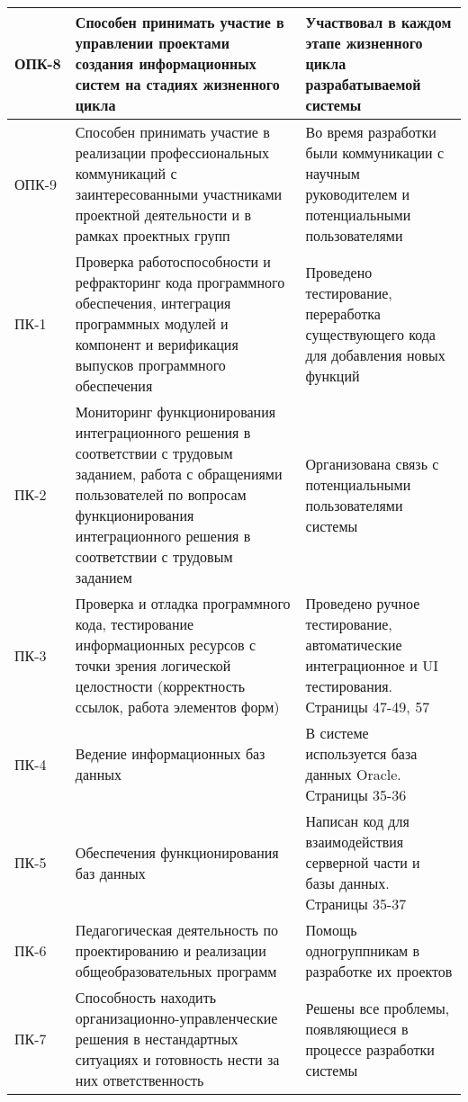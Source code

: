 \documentclass[a4paper,article]{article}
\begin{document}
\begin{sloppypar}
\begin{xltabular}{\textwidth} { |
                >{\hsize} X |
                >{\hsize} X |
                >{\hsize} X | }
            \hline
            ОПК-8
            & Способен принимать участие в управлении проектами создания информационных систем на стадиях жизненного цикла 
            & Участвовал в каждом этапе жизненного цикла разрабатываемой системы \\
            \hline
            ОПК-9
            & Способен принимать участие в реализации профессиональных коммуникаций с заинтересованными участниками проектной деятельности и в рамках проектных групп
            & Во время разработки были коммуникации с научным руководителем и потенциальными пользователями \\
            \hline
            ПК-1
            & Проверка работоспособности и рефракторинг кода программного обеспечения, интеграция программных модулей и компонент и верификация выпусков программного обеспечения
            & Проведено тестирование, переработка существующего кода для добавления новых функций \\
            \hline
            ПК-2
            & Мониторинг функционирования интеграционного решения в соответствии с трудовым заданием, работа с обращениями пользователей по вопросам функционирования интеграционного решения в соответствии с трудовым заданием
            & Организована связь с потенциальными пользователями системы \\
            \hline
            ПК-3
            & Проверка и отладка программного кода, тестирование информационных ресурсов с точки зрения логической целостности (корректность ссылок, работа элементов форм)
            & Проведено ручное тестирование, автоматические интеграционное и UI тестирования. Страницы 47-49, 57 \\
            \hline
            ПК-4
            & Ведение информационных баз данных 
            & В системе используется база данных Oracle. Страницы 35-36 \\
            \hline
            ПК-5
            & Обеспечения функционирования баз данных
            & Написан код для взаимодействия серверной части и базы данных. Страницы 35-37 \\
            \hline
            ПК-6
            & Педагогическая деятельность по проектированию и реализации общеобразовательных программ
            & Помощь одногруппникам в разработке их проектов \\
            \hline
            ПК-7
            & Способность находить организационно-управленческие решения в нестандартных ситуациях и готовность нести за них ответственность
            & Решены все проблемы, появляющиеся в процессе разработки системы \\

\end{xltabular}
\end{sloppypar}
\end{document}
